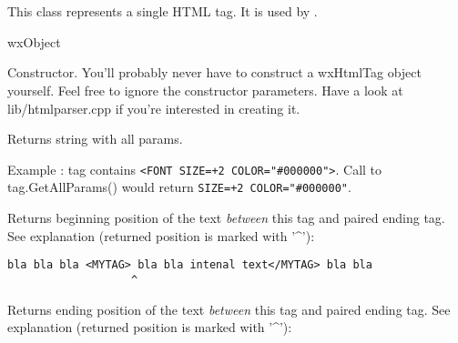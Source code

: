 %
%

\section{}\label{wxhtmltag}

This class represents a single HTML tag. 
It is used by .


wxObject


\label{wxhtmltagwxhtmltag}


Constructor. You'll probably never have to construct a wxHtmlTag object
yourself. Feel free to ignore the constructor parameters.
Have a look at lib/htmlparser.cpp if you're interested in creating it.

\label{wxhtmltaggetallparams}


Returns string with all params. 

Example : tag contains {\tt <FONT SIZE=+2 COLOR="\#000000">}. Call to
tag.GetAllParams() would return {\tt SIZE=+2 COLOR="\#000000"}.

\label{wxhtmltaggetbeginpos}


Returns beginning position of the text {\it between} this tag and paired
ending tag. 
See explanation (returned position is marked with '^'):

\begin{verbatim}
bla bla bla <MYTAG> bla bla intenal text</MYTAG> bla bla
                   ^
\end{verbatim}

\label{wxhtmltaggetendpos1}


Returns ending position of the text {\it between} this tag and paired
ending tag.
See explanation (returned position is marked with '^'):

